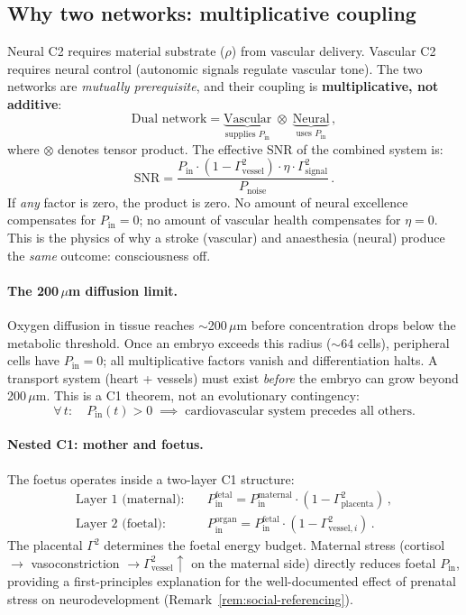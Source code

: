 \documentclass[aps,pre,twocolumn,superscriptaddress,floatfix]{revtex4-2}
\begin{document}
\subsection{Why two networks: multiplicative coupling}

Neural C2 requires material substrate ($\rho$) from
vascular delivery.
Vascular C2 requires neural control (autonomic signals
regulate vascular tone).
The two networks are \emph{mutually prerequisite},
and their coupling is \textbf{multiplicative, not
additive}:
\begin{equation}
  \boxed{\text{Dual network}
  = \underbrace{\text{Vascular}}_{\text{supplies } P_{\text{in}}}
  \;\otimes\;
  \underbrace{\text{Neural}}_{\text{uses } P_{\text{in}}}\,,}
  \label{eq:tensor-dual}
\end{equation}
where $\otimes$ denotes tensor product.
The effective SNR of the combined system is:
\[
  \text{SNR} = \frac{P_{\text{in}}
  \cdot (1 - \Gamma^2_{\text{vessel}})
  \cdot \eta \cdot \Gamma^2_{\text{signal}}}
  {P_{\text{noise}}}\,.
\]
If \emph{any} factor is zero, the product is zero.
No amount of neural excellence compensates for
$P_{\text{in}} = 0$; no amount of vascular health
compensates for $\eta = 0$.
This is the physics of why a stroke (vascular) and
anaesthesia (neural) produce the \emph{same} outcome:
consciousness off.

\paragraph{The 200\,$\mu$m diffusion limit.}
Oxygen diffusion in tissue reaches
$\sim$200\,$\mu$m before concentration drops below
the metabolic threshold.
Once an embryo exceeds this radius ($\sim$64 cells),
peripheral cells have $P_{\text{in}} = 0$;
all multiplicative factors vanish and differentiation
halts.
A transport system (heart + vessels) must exist
\emph{before} the embryo can grow beyond 200\,$\mu$m.
This is a C1 theorem, not an evolutionary contingency:
\[
  \forall\, t:\quad P_{\text{in}}(t) > 0 \;\implies\;
  \text{cardiovascular system precedes all others.}
\]

\paragraph{Nested C1: mother and foetus.}
The foetus operates inside a two-layer C1 structure:
\begin{align}
  \text{Layer 1 (maternal):} &\quad
    P_{\text{in}}^{\text{fetal}}
    = P_{\text{in}}^{\text{maternal}}
    \cdot (1 - \Gamma^2_{\text{placenta}})\,, \nonumber\\
  \text{Layer 2 (foetal):} &\quad
    P_{\text{in}}^{\text{organ}}
    = P_{\text{in}}^{\text{fetal}}
    \cdot (1 - \Gamma^2_{\text{vessel},i})\,.
    \label{eq:nested-C1}
\end{align}
The placental $\Gamma^2$ determines the foetal energy
budget.
Maternal stress (cortisol $\to$ vasoconstriction
$\to \Gamma^2_{\text{vessel}} \uparrow$ on the
maternal side) directly reduces foetal $P_{\text{in}}$,
providing a first-principles explanation for the
well-documented effect of prenatal stress on
neurodevelopment
(Remark~\ref{rem:social-referencing}).
\end{document}
